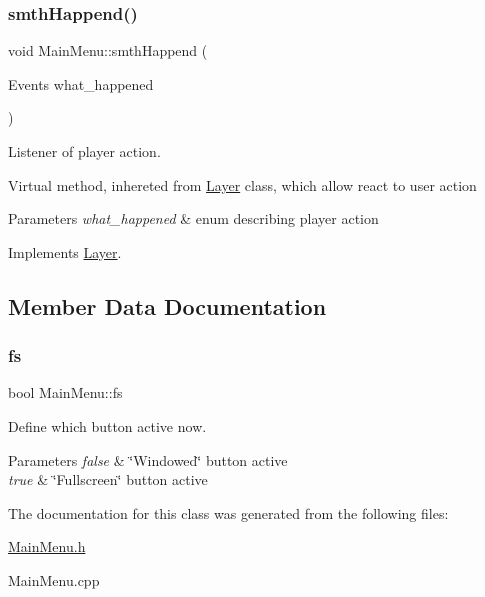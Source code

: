 \subsubsection{\texorpdfstring{smth\+Happend()}{smthHappend()}}
{\footnotesize\ttfamily void Main\+Menu\+::smth\+Happend (\begin{DoxyParamCaption}\item[{Events}]{what\+\_\+happened }\end{DoxyParamCaption})\hspace{0.3cm}{\ttfamily [virtual]}}



Listener of player action. 

Virtual method, inhereted from \hyperlink{class_layer}{Layer} class, which allow react to user action 
\begin{DoxyParams}{Parameters}
{\em what\+\_\+happened} & enum describing player action \\
\hline
\end{DoxyParams}


Implements \hyperlink{class_layer}{Layer}.



\subsection{Member Data Documentation}
\mbox{\label{class_main_menu_a22890c1716e56c182b500088c13d7f34}} 
\subsubsection{\texorpdfstring{fs}{fs}}
{\footnotesize\ttfamily bool Main\+Menu\+::fs\hspace{0.3cm}{\ttfamily [private]}}



Define which button active now. 


\begin{DoxyParams}{Parameters}
{\em false} & \char`\"{}\+Windowed\char`\"{} button active \\
\hline
{\em true} & \char`\"{}\+Fullscreen\char`\"{} button active \\
\hline
\end{DoxyParams}


The documentation for this class was generated from the following files\+:\begin{DoxyCompactItemize}
\item 
\hyperlink{_main_menu_8h}{Main\+Menu.\+h}\item 
Main\+Menu.\+cpp\end{DoxyCompactItemize}
